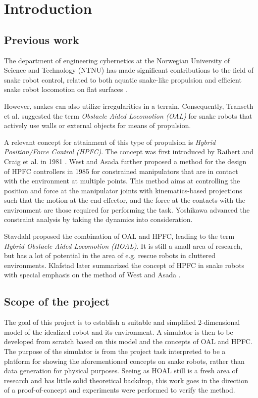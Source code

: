 
\chapter{Introduction}\label{Chapter:introduction}

\section{Previous work}
The department of engineering cybernetics at the Norwegian University of Science and Technology (NTNU) has made significant contributions to the field of snake robot control, related to both aquatic snake-like propulsion and efficient snake robot locomotion on flat surfaces \cite{StavdahlNote}.

However, snakes can also utilize irregularities in a terrain. Consequently, Transeth et al. \cite{transeth2008snake} suggested the term \textit{Obstacle Aided Locomotion (OAL)} for snake robots that actively use walls or external objects for means of propulsion.

A relevant concept for attainment of this type of propulsion is \textit{Hybrid Position/Force Control (HPFC)}. The concept was first introduced by Raibert and Craig et al. in 1981 \cite{raibert1981hybrid}. West and Asada \cite{west1985method} further proposed a method for the design of HPFC controllers in 1985 for constrained manipulators that are in contact with the environment at multiple points. This method aims at controlling the position and force at the manipulator joints with kinematics-based projections such that the motion at the end effector, and the force at the contacts with the environment are those required for performing the task. Yoshikawa \cite{yoshikawa1987dynamic} advanced the constraint analysis by taking the dynamics into consideration.


Stavdahl \cite{StavdahlNote} proposed the combination of OAL and HPFC, leading to the term \textit{Hybrid Obstacle Aided Locomotion (HOAL)}. It is still a small area of research, but has a lot of potential in the area of e.g. rescue robots in cluttered environments. Klafstad \cite{TorjusOppg} later summarized the concept of HPFC in snake robots with special emphasis on the method of West and Asada \cite{west1985method}.

\section{Scope of the project}
The goal of this project is to establish a suitable and simplified 2-dimensional model of the idealized robot and its environment. A simulator is then to be developed from scratch based on this model and the concepts of OAL and HPFC. The purpose of the simulator is from the project task interpreted to be a platform for showing the aforementioned concepts on snake robots, rather than data generation for physical purposes.
Seeing as HOAL still is a fresh area of research and has little solid theoretical backdrop, this work goes in the direction of a proof-of-concept and experiments were performed to verify the method.

